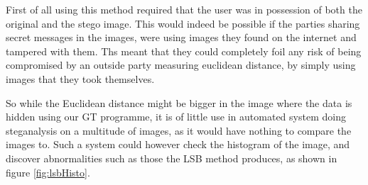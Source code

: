 First of all using this method required that the user was in possession of both the original and the stego image.
This would indeed be possible if the parties sharing secret messages in the images, were using images they found on the internet and tampered with them.
Ths meant that they could completely foil any risk of being compromised by an outside party measuring euclidean distance, by simply using images that they took themselves.

So while the Euclidean distance might be bigger in the image where the data is hidden using our GT programme, it is of little use in automated system doing steganalysis on a multitude of images, as it would have nothing to compare the images to. 
Such a system could however check the histogram of the image, and discover abnormalities such as those the LSB method produces, as shown in figure \ref{fig:lsbHisto}.